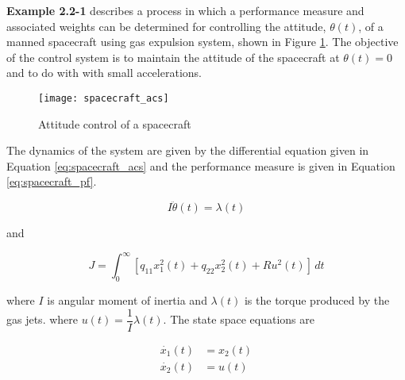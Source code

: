 
\begin{question}{1}
\end{question}
\textbf{Example 2.2-1} describes a process in which a performance measure and
associated weights can be determined for controlling the attitude, $\theta(t)$,
of a manned spacecraft using gas expulsion system, shown in Figure \ref{fig:spacecraft_acs}.
The objective of the control system is to maintain the attitude of the
spacecraft at $\theta(t) = 0$ and to do with with small accelerations.

\begin{figure}[h]
    \texttt{[image: spacecraft\_acs]}
    \centering
    \caption{Attitude control of a spacecraft \cite{kirkdover}}
    \label{fig:spacecraft_acs}
\end{figure}

The dynamics of the system are given by the differential equation given in
Equation \ref{eq:spacecraft_acs} and the performance measure is given in
Equation \ref{eq:spacecraft_pf}.

\begin{equation}
    I \ddot{\theta}(t) = \lambda(t) \label{eq:spacecraft_acs}
\end{equation}

and

\begin{equation}
    J = \int_{0}^{\infty} [q_{11} x_1^2(t) + q_{22} x_2^2(t) + R u^2 (t)] \, dt
    \label{eq:spacecraft_pf}
\end{equation}

\noindent where $I$ is angular moment of inertia and $\lambda(t)$ is the
torque produced by the gas jets.
\noindent where $u(t) = \dfrac{1}{I} \lambda(t)$. The state space equations are

\begin{align}
    \dot{x_1}(t) &= x_2 (t) \label{eq:sc_ssr_s1} \\
    \dot{x_2}(t) &= u (t) \label{eq:sc_ssr_x2}
\end{align}

